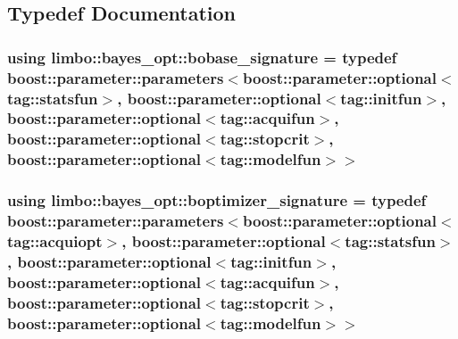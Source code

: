 \subsection{Typedef Documentation}
\hypertarget{namespacelimbo_1_1bayes__opt_a824303857a6912240f23e422927773f7}{}
\subsubsection[{bobase\+\_\+signature}]{\setlength{\rightskip}{0pt plus 5cm}using {\bf limbo\+::bayes\+\_\+opt\+::bobase\+\_\+signature} = typedef boost\+::parameter\+::parameters$<$boost\+::parameter\+::optional$<$tag\+::statsfun$>$, boost\+::parameter\+::optional$<$tag\+::initfun$>$, boost\+::parameter\+::optional$<$tag\+::acquifun$>$, boost\+::parameter\+::optional$<$tag\+::stopcrit$>$, boost\+::parameter\+::optional$<$tag\+::modelfun$>$$>$}\label{namespacelimbo_1_1bayes__opt_a824303857a6912240f23e422927773f7}
\hypertarget{namespacelimbo_1_1bayes__opt_a6f7eddef5a0de80d03fe4df398480997}{}
\subsubsection[{boptimizer\+\_\+signature}]{\setlength{\rightskip}{0pt plus 5cm}using {\bf limbo\+::bayes\+\_\+opt\+::boptimizer\+\_\+signature} = typedef boost\+::parameter\+::parameters$<$boost\+::parameter\+::optional$<$tag\+::acquiopt$>$, boost\+::parameter\+::optional$<$tag\+::statsfun$>$, boost\+::parameter\+::optional$<$tag\+::initfun$>$, boost\+::parameter\+::optional$<$tag\+::acquifun$>$, boost\+::parameter\+::optional$<$tag\+::stopcrit$>$, boost\+::parameter\+::optional$<$tag\+::modelfun$>$$>$}\label{namespacelimbo_1_1bayes__opt_a6f7eddef5a0de80d03fe4df398480997}
